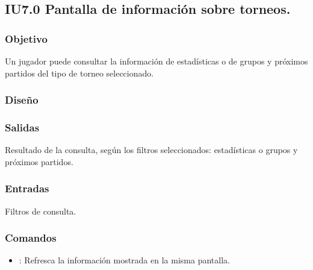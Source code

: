 
\subsection{IU7.0 Pantalla de información sobre torneos.}

\subsubsection{Objetivo}
	Un jugador puede consultar la información de estadísticas o de grupos y próximos partidos del tipo de torneo seleccionado.

\subsubsection{Diseño}


\subsubsection{Salidas}

	Resultado de la consulta, según los filtros seleccionados: estadísticas o grupos y próximos partidos.

\subsubsection{Entradas}
	Filtros de consulta.

\subsubsection{Comandos}
\begin{itemize}
	\item {}: Refresca la información mostrada en la misma pantalla.
\end{itemize}

